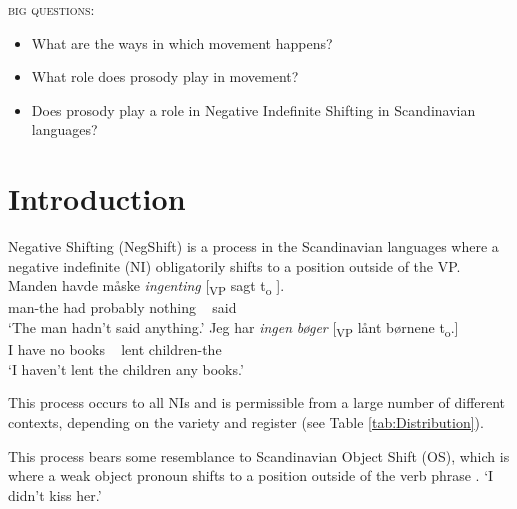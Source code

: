 \documentclass[12pt, letterpaper]{article}
\begin{document}
\begin{tcolorbox}[width=\linewidth]
\textsc{big questions}:
\begin{itemize}
\item What are the ways in which movement happens?
\item What role does prosody play in movement?
\item Does prosody play a role in Negative Indefinite Shifting in Scandinavian languages?
\end{itemize}
\end{tcolorbox}
\section{Introduction} \label{sec:NEGSHIFT}
\ea Negative Shifting (NegShift) is a process in the Scandinavian languages where a negative indefinite (NI) obligatorily shifts to a position outside of the VP.
	\ea
	\gll Manden havde måske \textit{ingenting} [\textsubscript{VP} sagt t\textsubscript{o} ].\\
	man-the had probably nothing ~ said\\
	\glt `The man hadn't said anything.'
	\ex 
	\gll Jeg har \textit{ingen} \textit{bøger} [\textsubscript{VP} lånt børnene t\textsubscript{o}.]\\
	I have no books ~ lent children-the\\
	\glt `I haven't lent the children any books.'
	\z

\ex This process occurs to all NIs and is permissible from a large number of different contexts, depending on the variety and register (see Table \ref{tab:Distribution}). 

\ex This process bears some resemblance to Scandinavian Object Shift (OS), which is where a weak object pronoun shifts to a position outside of the verb phrase \citep{holmbergWordOrderSyntactic1986,holmbergRemarksHolmbergGeneralization1999}.
	 
	\glt `I didn't kiss her.'
	\z 
\end{document}
